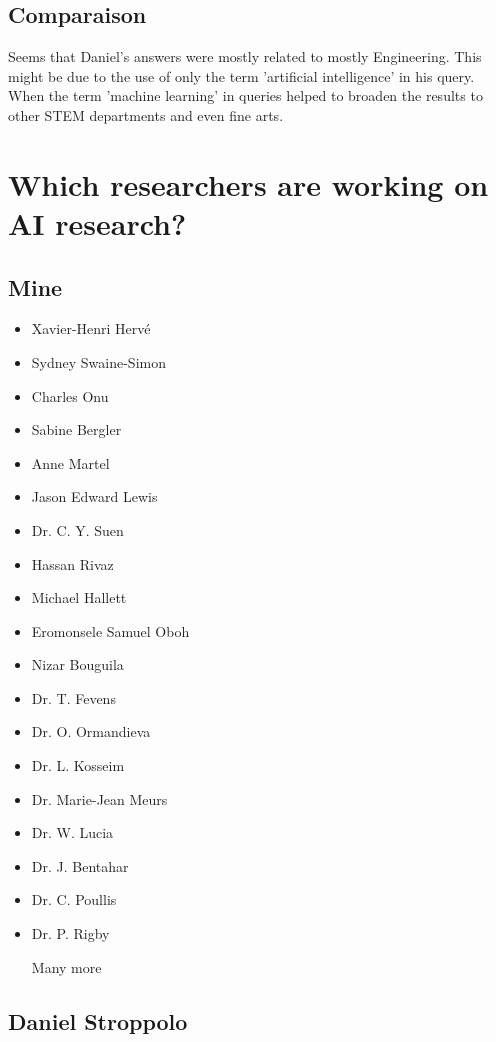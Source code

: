 \subsection{Comparaison}

\par Seems that Daniel's answers were mostly related to mostly Engineering. This might be due to the use of only the term 'artificial intelligence' in his query. When the term 'machine learning' in queries helped to broaden the results to other STEM departments and even fine arts.

\section{Which researchers are working on AI research?}

\subsection{Mine}

\begin{itemize}
    \item Xavier-Henri Hervé
    \item Sydney Swaine-Simon
    \item Charles Onu
    \item Sabine Bergler
    \item Anne Martel
    \item Jason Edward Lewis
    \item Dr. C. Y. Suen
    \item Hassan Rivaz
    \item Michael Hallett
    \item Eromonsele Samuel Oboh
    \item Nizar Bouguila
    \item Dr. T. Fevens
    \item Dr. O. Ormandieva
    \item Dr. L. Kosseim
    \item Dr. Marie-Jean Meurs
    \item Dr. W. Lucia
    \item Dr. J. Bentahar
    \item Dr. C. Poullis
    \item Dr. P. Rigby
    \item [Many more]    
\end{itemize}

\subsection{Daniel Stroppolo}

